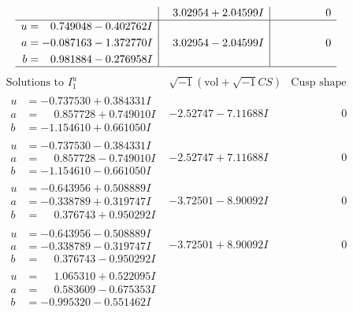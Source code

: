\documentclass[1p]{elsarticle_modified}
\theoremstyle{definition}
\newcommand{\I}{\sqrt{-1}}
\begin{document}
$$\begin{array}{c|c|c}
 & \phantom{-}3.02954 + 2.04599 I & \phantom{-0.000000 } 0 \\ \hline\begin{aligned}
u &= \phantom{-}0.749048 - 0.402762 I \\
a &= -0.087163 - 1.372770 I \\
b &= \phantom{-}0.981884 - 0.276958 I\end{aligned}
 & \phantom{-}3.02954 - 2.04599 I & \phantom{-0.000000 } 0\\
 \hline 
 \end{array}$$\newpage$$\begin{array}{c|c|c}  
\text{Solutions to }I^u_{1}& \I (\text{vol} + \sqrt{-1}CS) & \text{Cusp shape}\\
 \hline 
\begin{aligned}
u &= -0.737530 + 0.384331 I \\
a &= \phantom{-}0.857728 + 0.749010 I \\
b &= -1.154610 + 0.661050 I\end{aligned}
 & -2.52747 - 7.11688 I & \phantom{-0.000000 } 0 \\ \hline\begin{aligned}
u &= -0.737530 - 0.384331 I \\
a &= \phantom{-}0.857728 - 0.749010 I \\
b &= -1.154610 - 0.661050 I\end{aligned}
 & -2.52747 + 7.11688 I & \phantom{-0.000000 } 0 \\ \hline\begin{aligned}
u &= -0.643956 + 0.508889 I \\
a &= -0.338789 + 0.319747 I \\
b &= \phantom{-}0.376743 + 0.950292 I\end{aligned}
 & -3.72501 - 8.90092 I & \phantom{-0.000000 } 0 \\ \hline\begin{aligned}
u &= -0.643956 - 0.508889 I \\
a &= -0.338789 - 0.319747 I \\
b &= \phantom{-}0.376743 - 0.950292 I\end{aligned}
 & -3.72501 + 8.90092 I & \phantom{-0.000000 } 0 \\ \hline\begin{aligned}
u &= \phantom{-}1.065310 + 0.522095 I \\
a &= \phantom{-}0.583609 - 0.675353 I \\
b &= -0.995320 - 0.551462 I\end{aligned}

\end{array}$$
\end{document}
